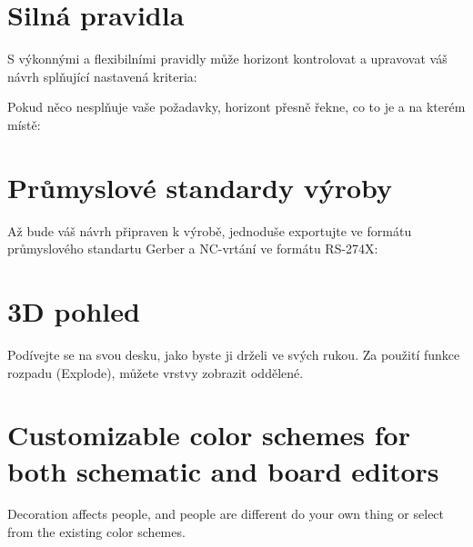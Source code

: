 \documentclass[letterpaper,10pt,czech]{sphinxmanual}
\begin{document}
\noindent{}


\section{Silná pravidla}
\label{\detokenize{feature-overview:silna-pravidla}}
S výkonnými a flexibilními pravidly může horizont kontrolovat a upravovat váš
návrh splňující nastavená kriteria:

\noindent{}

Pokud něco nesplňuje vaše požadavky, horizont přesně řekne, co to je a
na kterém místě:

\noindent{}


\section{Průmyslové standardy výroby}
\label{\detokenize{feature-overview:prumyslove-standardy-vyroby}}
Až bude váš návrh připraven k výrobě, jednoduše exportujte ve formátu
průmyslového standartu Gerber a NC-vrtání ve formátu RS-274X:

\noindent{}


\section{3D pohled}
\label{\detokenize{feature-overview:d-pohled}}
Podívejte se na svou desku, jako byste ji drželi ve svých rukou. Za použití funkce rozpadu (Explode), můžete vrstvy zobrazit oddělené.

\noindent{}


\section{Customizable color schemes for both schematic and board editors}
\label{\detokenize{feature-overview:customizable-color-schemes-for-both-schematic-and-board-editors}}
Decoration affects people, and people are different \textendash{} do your own thing or select from the existing color schemes.

\noindent{}

\noindent{}

\noindent{}

\noindent{}
\end{document}
